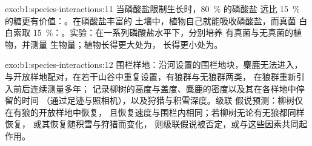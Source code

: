 \begin{solution}{exo:b1:species-interactions:11}
当磷酸盐限制生长时，\qty{80}{\%} 的磷酸盐
远比 \qty{15}{\%} 的糖更有价值：。在磷酸盐丰富的
土壤中，植物自己就能吸收磷酸盐，而真菌
白白索取 \qty{15}{\%}：。实验：在一系列磷酸盐水平下，分别培养
有真菌与无真菌的植物，并测量
生物量；植物长得更大处为，
长得更小处为。
\end{solution}

\begin{solution}{exo:b1:species-interactions:12}
围栏样地：沿河设置的围栏地块，麋鹿无法进入，
与开放样地配对，在若干山谷中重复设置，有狼群与无狼群两类，
在狼群重新引入前后连续测量多年；
记录柳树的高度与盖度、麋鹿的密度以及其在各样地中停留的时间
（通过足迹与照相机），以及狩猎与积雪深度。级联
假说预测：柳树仅在有狼的开放样地中恢复，
且恢复速度与围栏内相同；若柳树无论有无狼都同样恢复，
或其恢复随积雪与狩猎而变化，
则级联假说被否定，或与这些因素共同起作用。
\end{solution}

